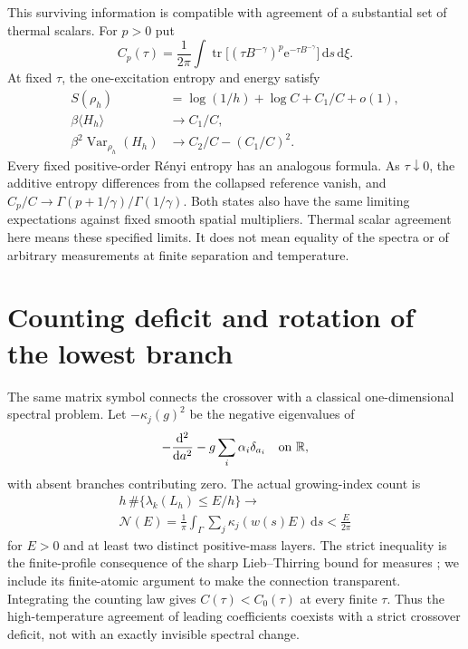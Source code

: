 \documentclass[aps,pra,reprint,superscriptaddress,longbibliography]{revtex4-2}
\newcommand{\dd}{\mathrm d}
\newcommand{\ee}{\mathrm e}
\begin{document}
This surviving information is compatible with agreement of a substantial
set of thermal scalars. For $p>0$ put
\begin{equation}
 C_p(\tau)=\frac1{2\pi}\int
   \operatorname{tr}\bigl[(\tau B^{-\gamma})^p
                        \ee^{-\tau B^{-\gamma}}\bigr]\,\dd s\,\dd\xi.
 \label{sgt:main:moments}
\end{equation}
At fixed $\tau$, the one-excitation entropy and energy satisfy
\begin{align}
 S(\rho_h)&=\log(1/h)+\log C+C_1/C+o(1),\nonumber\\
 \beta\langle H_h\rangle&\longrightarrow C_1/C,\nonumber\\
 \beta^2\operatorname{Var}_{\rho_h}(H_h)&\longrightarrow
                              C_2/C-(C_1/C)^2.
 \label{sgt:main:scalars}
\end{align}
Every fixed positive-order R\'enyi entropy has an analogous formula.
As $\tau\downarrow0$, the additive entropy differences from the collapsed
reference vanish, and
$C_p/C\to\Gamma(p+1/\gamma)/\Gamma(1/\gamma)$.
Both states also have the same limiting expectations against fixed
smooth spatial multipliers. Thermal scalar agreement here means these
specified limits. It does not mean equality of the spectra or of
arbitrary measurements at finite separation and temperature.

\section{Counting deficit and rotation of the lowest branch}
\label{sgt:main:structure}

The same matrix symbol connects the crossover with a classical
one-dimensional spectral problem. Let $-\kappa_j(g)^2$ be the negative
eigenvalues of
\begin{equation}
 -\frac{\dd^2}{\dd a^2}-g\sum_i\alpha_i\delta_{a_i}
 \quad\hbox{on }\mathbb R,
 \label{sgt:main:delta}
\end{equation}
with absent branches contributing zero. The actual growing-index count is
\begin{equation}
\begin{gathered}
 h\,\#\{\lambda_k(L_h)\le E/h\}\longrightarrow
\\
 \mathcal N(E)=\frac1\pi\int_\Gamma
                \sum_j\kappa_j(w(s)E)\,\dd s
 <\frac{E}{2\pi}
 \label{sgt:main:count}
\end{gathered}
\end{equation}
for $E>0$ and at least two distinct positive-mass layers. The strict
inequality is the finite-profile consequence of the sharp
Lieb--Thirring bound for measures
\cite{HundertmarkLiebThomas1998}; we include its finite-atomic argument
to make the connection transparent. Integrating the counting law gives
$C(\tau)<C_0(\tau)$ at every finite $\tau$. Thus the high-temperature
agreement of leading coefficients coexists with a strict crossover
deficit, not with an exactly invisible spectral change.
\end{document}
